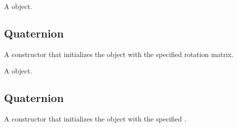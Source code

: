 \documentclass[letterpaper,12pt,english,openany,oneside]{sphinxmanual}
\begin{document}
\label{\detokenize{JS_3D_API:syntax-72}}

\begin{sphinxVerbatim}[commandchars=\\\{\}]
 
\end{sphinxVerbatim}
\label{\detokenize{JS_3D_API:returns-73}}

A  object.


\subsection{Quaternion}
\label{\detokenize{JS_3D_API:quaternion-2}}\label{\detokenize{JS_3D_API:id22}}
A constructor that initializes the object with the specified rotation matrix.

\label{\detokenize{JS_3D_API:syntax-73}}

\begin{sphinxVerbatim}[commandchars=\\\{\}]
 
\end{sphinxVerbatim}
\label{\detokenize{JS_3D_API:parameters-53}}

\label{\detokenize{JS_3D_API:section-77}}\label{\detokenize{JS_3D_API:returns-74}}

A  object.


\subsection{Quaternion}
\label{\detokenize{JS_3D_API:quaternion-3}}\label{\detokenize{JS_3D_API:id23}}
A constructor that initializes the object with the specified .

\label{\detokenize{JS_3D_API:syntax-74}}

\begin{sphinxVerbatim}[commandchars=\\\{\}]
 
\end{sphinxVerbatim}
\label{\detokenize{JS_3D_API:parameters-54}}
\end{document}
